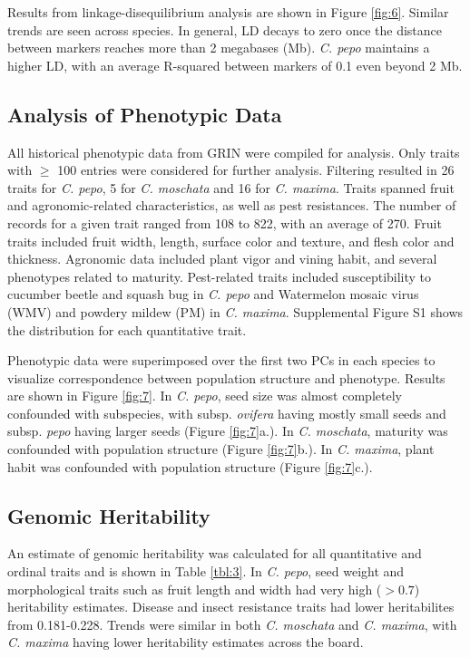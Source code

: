 \documentclass[utf8]{FrontiersinHarvard} %
\begin{document}
Results from linkage-disequilibrium analysis are shown in Figure \ref{fig:6}. Similar trends are seen across species. In general, LD decays to zero once the distance between markers reaches more than 2 megabases (Mb). \textit{C. pepo} maintains a higher LD, with an average R-squared between markers of 0.1 even beyond 2 Mb. 

\subsection{Analysis of Phenotypic Data}
All  historical phenotypic data from GRIN were compiled for analysis. Only traits with $\geq$ 100 entries were considered for further analysis. Filtering resulted in 26 traits for \textit{C. pepo}, 5 for \textit{C. moschata} and 16 for \textit{C. maxima}. Traits spanned fruit and agronomic-related characteristics, as well as pest resistances. The number of records for a given trait ranged from 108 to 822, with an average of  270. Fruit traits included fruit width, length, surface color and texture, and flesh color and thickness. Agronomic data included plant vigor and vining habit, and several phenotypes related to maturity. Pest-related traits included susceptibility to cucumber beetle and squash bug in \textit{C. pepo} and Watermelon mosaic virus (WMV) and powdery mildew (PM) in \textit{C. maxima}. Supplemental Figure S1 shows the distribution for each quantitative trait. 

Phenotypic data were superimposed over the first two PCs in each species to visualize correspondence between population structure and phenotype. Results are shown in Figure \ref{fig:7}. In \textit{C. pepo}, seed size was almost completely confounded with subspecies, with subsp. \textit{ovifera} having mostly small seeds and subsp. \textit{pepo} having larger seeds (Figure \ref{fig:7}a.). In \textit{C. moschata}, maturity was confounded with population structure (Figure \ref{fig:7}b.).  In \textit{C. maxima}, plant habit was confounded with population structure (Figure \ref{fig:7}c.).

\subsection{Genomic Heritability}

An estimate of genomic heritability was calculated for all quantitative and ordinal traits and is shown in Table \ref{tbl:3}. In \textit{C. pepo}, seed weight and morphological traits such as fruit length and width had very high ($>0.7$) heritability estimates. Disease and insect resistance traits had lower heritabilites from 0.181-0.228. Trends were similar in both \textit{C. moschata} and \textit{C. maxima}, with \textit{C. maxima} having lower heritability estimates across the board. 
\end{document}
